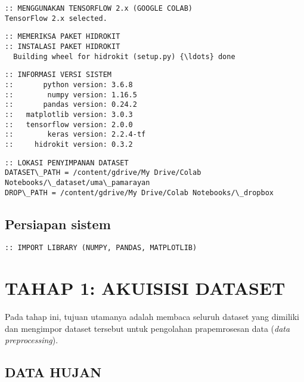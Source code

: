 \documentclass[11pt]{article}
\begin{document}
    \begin{Verbatim}[commandchars=\\\{\}]
:: MENGGUNAKAN TENSORFLOW 2.x (GOOGLE COLAB)
TensorFlow 2.x selected.
    \end{Verbatim}

    \begin{Verbatim}[commandchars=\\\{\}]
:: MEMERIKSA PAKET HIDROKIT
:: INSTALASI PAKET HIDROKIT
  Building wheel for hidrokit (setup.py) {\ldots} done
    \end{Verbatim}

    \begin{Verbatim}[commandchars=\\\{\}]
:: INFORMASI VERSI SISTEM
::       python version: 3.6.8
::        numpy version: 1.16.5
::       pandas version: 0.24.2
::   matplotlib version: 3.0.3
::   tensorflow version: 2.0.0
::        keras version: 2.2.4-tf
::     hidrokit version: 0.3.2
    \end{Verbatim}

    \begin{Verbatim}[commandchars=\\\{\}]
:: LOKASI PENYIMPANAN DATASET
DATASET\_PATH = /content/gdrive/My Drive/Colab Notebooks/\_dataset/uma\_pamarayan
DROP\_PATH = /content/gdrive/My Drive/Colab Notebooks/\_dropbox
    \end{Verbatim}

    \hypertarget{persiapan-sistem}{%
\subsection{Persiapan sistem}\label{persiapan-sistem}}

    \begin{Verbatim}[commandchars=\\\{\}]
:: IMPORT LIBRARY (NUMPY, PANDAS, MATPLOTLIB)
    \end{Verbatim}

    \hypertarget{tahap-1-akuisisi-dataset}{%
\section{TAHAP 1: AKUISISI DATASET}\label{tahap-1-akuisisi-dataset}}

Pada tahap ini, tujuan utamanya adalah membaca seluruh dataset yang
dimiliki dan mengimpor dataset tersebut untuk pengolahan prapemrosesan
data (\emph{data preprocessing}).

    \hypertarget{data-hujan}{%
\subsection{DATA HUJAN}\label{data-hujan}}
\end{document}

